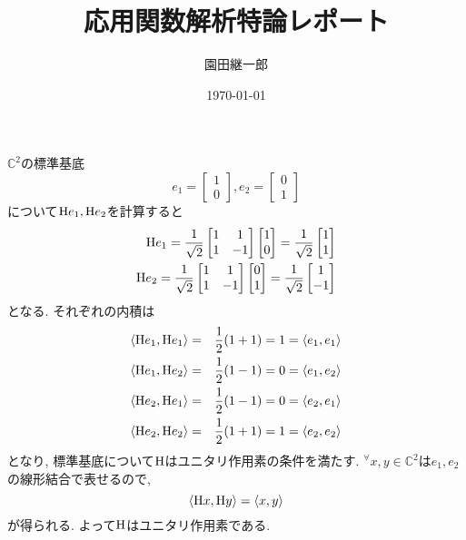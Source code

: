 \documentclass[a4paper,11pt]{jsarticle}
\begin{document}
\title{応用関数解析特論レポート}
\author{園田継一郎}
\date{\today}
\maketitle

\section{}
$\mathbb{C}^2$の標準基底
\[
  e_1 = \begin{bmatrix}
    1 \\ 0
  \end{bmatrix}, 
  e_2 = \begin{bmatrix}
    0 \\ 1
  \end{bmatrix}
\]
について${\rm H}e_1, {\rm H}e_2$を計算すると
\begin{eqnarray*}
  {\rm H}e_1 = \frac{1}{\sqrt{2}} \begin{bmatrix}
    1 & 1 \\ 1 & -1
  \end{bmatrix} \begin{bmatrix}
    1 \\ 0
  \end{bmatrix} = \frac{1}{\sqrt{2}} \begin{bmatrix}
    1 \\ 1
  \end{bmatrix} \\
  {\rm H}e_2 = \frac{1}{\sqrt{2}} \begin{bmatrix}
    1 & 1 \\ 1 & -1
  \end{bmatrix} \begin{bmatrix}
    0 \\ 1
  \end{bmatrix} = \frac{1}{\sqrt{2}} \begin{bmatrix}
    1 \\ -1
  \end{bmatrix}
\end{eqnarray*}
となる. それぞれの内積は
\begin{eqnarray*}
  \left<{\rm H}e_1, {\rm H}e_1\right>
  &=& \frac{1}{2}(1 + 1) = 1 = \left<e_1, e_1\right> \\
  \left<{\rm H}e_1, {\rm H}e_2\right>
  &=& \frac{1}{2}(1 - 1) = 0 = \left<e_1, e_2\right> \\
  \left<{\rm H}e_2, {\rm H}e_1\right>
  &=& \frac{1}{2}(1 - 1) = 0 = \left<e_2, e_1\right> \\
  \left<{\rm H}e_2, {\rm H}e_2\right>
  &=& \frac{1}{2}(1 + 1) = 1 = \left<e_2, e_2\right> \\
\end{eqnarray*}
となり, 標準基底について${\rm H}$はユニタリ作用素の条件を満たす.
${}^\forall x, y \in \mathbb{C}^2$は$e_1, e_2$
の線形結合で表せるので, 
\[
  \left<{\rm H}x, {\rm H}y\right> = \left<x, y\right>
\]
が得られる. よって${\rm H}$はユニタリ作用素である.
\end{document}
